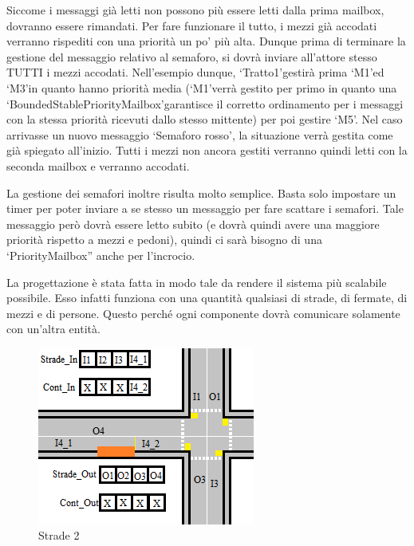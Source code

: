 \documentclass{article}
\begin{document}
Siccome i messaggi gi\`{a} letti non possono pi\`{u} essere letti dalla prima mailbox, dovranno essere rimandati. Per fare funzionare il tutto, i mezzi gi\`{a} accodati verranno rispediti con una priorit\`{a} un po\textquoteright{} pi\`{u} alta. Dunque prima di terminare la gestione del messaggio relativo al semaforo, si dovr\`{a} inviare all\textquoteright{}attore stesso TUTTI i mezzi accodati. Nell\textquoteright{}esempio dunque, \lq Tratto1\rq gestir\`{a} prima \lq M1\rq ed \lq M3\rq in quanto hanno priorit\`{a} media (\lq M1\rq verr\`{a} gestito per primo in quanto una \lq BoundedStablePriorityMailbox\rq garantisce il corretto ordinamento per i messaggi con la stessa priorit\`{a} ricevuti dallo stesso mittente) per poi gestire \lq M5\rq. Nel caso arrivasse un nuovo messaggio \lq Semaforo rosso\rq, la situazione verr\`{a} gestita come gi\`{a} spiegato all\textquoteright{}inizio. Tutti i mezzi non ancora gestiti verranno quindi letti con la seconda mailbox e verranno accodati.
\par La gestione dei semafori inoltre risulta molto semplice. Basta solo impostare un timer per poter inviare a se stesso un messaggio per fare scattare i semafori. Tale messaggio per\`{o} dovr\`{a} essere letto subito (e dovr\`{a} quindi avere una maggiore priorit\`{a} rispetto a mezzi e pedoni), quindi ci sar\`{a} bisogno di una \lq PriorityMailbox” anche per l\textquoteright{}incrocio.
\par La progettazione \`{e} stata fatta in modo tale da rendere il sistema pi\`{u} scalabile possibile. Esso infatti funziona con una quantit\`{a} qualsiasi di strade, di fermate, di mezzi e di persone. Questo perch\'{e} ogni componente dovr\`{a} comunicare solamente con un\textquoteright{}altra entit\`{a}.
\begin{figure}[H]
\begin{center}
\includegraphics{./img/Strade2.png}
\caption{Strade 2}
\label{fig:Strade 2}
\end{center}
\end{figure}
\end{document}
